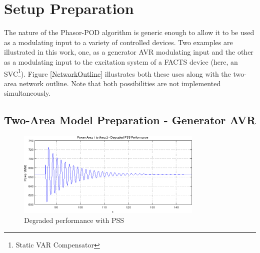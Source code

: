 \documentclass[journal]{IEEEtran}
\begin{document}
%



\section{Setup Preparation}\label{SetupPreparation}

The nature of the Phasor-POD algorithm is generic enough to allow it to be used as a modulating input to a variety of controlled devices. Two examples are illustrated in this work, one, as a generator AVR modulating input and the other as a modulating input to the excitation system of a FACTS device (here, an SVC\footnote{Static VAR Compensator}). Figure \ref{NetworkOutline} illustrates both these uses along with the two-area network outline. Note that both possibilities are not implemented simultaneously.

\subsection{Two-Area Model Preparation - Generator AVR}

\begin{figure}[!th]
\centering
\includegraphics[width=3.5in]{PSS_degraded_performance.png}
\caption{Degraded performance with PSS}
\label{PSS_Degrade}
\end{figure}
\end{document}
